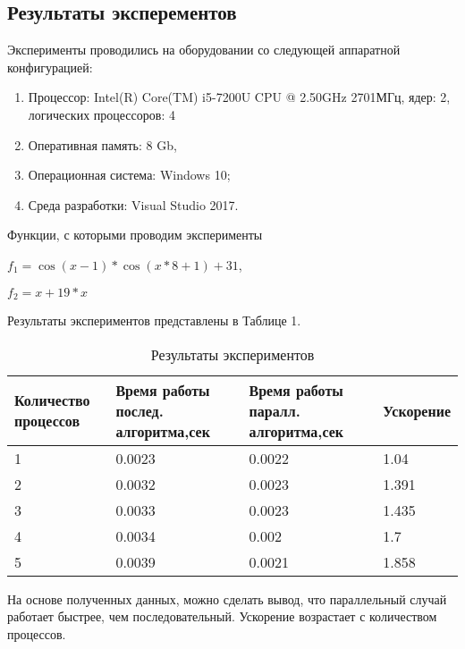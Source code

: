 \documentclass[a4paper]{report}
\begin{document}
\begin{center}
\section*{Результаты эксперементов}
\end{center}
\par Эксперименты проводились на оборудовании со следующей аппаратной конфигурацией:
\begin{enumerate}
\item Процессор: Intel(R) Core(TM) i5-7200U CPU @ 2.50GHz 2701МГц, ядер: 2, логических процессоров: 4
\item Оперативная память: 8 Gb,
\item Операционная система: Windows 10;
\item Среда разработки: Visual Studio 2017.
\end{enumerate}
\par Функции, с которыми проводим эксперименты 
\par $f_1 = \cos(x - 1) * \cos(x * 8 + 1) + 31$, 
\par $f_2 = x + 19 * x$
\par Результаты экспериментов представлены в Таблице 1.
\begin{table}[!h]
\caption{Результаты экспериментов}
\centering
\begin{tabular}{|p{3cm}|p{4cm}|p{4cm}|p{3cm}|}
\hline
Количество процессов & Время работы послед. алгоритма,сек & Время работы паралл. алгоритма,сек & Ускорение  \\\hline
1  & 0.0023 & 0.0022 & 1.04  \\\hline
2  & 0.0032 & 0.0023 & 1.391  \\\hline
3  & 0.0033 & 0.0023 & 1.435  \\\hline
4  & 0.0034 & 0.002 & 1.7  \\\hline
5  & 0.0039 & 0.0021 & 1.858  \\
\hline
\end{tabular}
\end{table}
\par На основе полученных данных, можно сделать вывод, что параллельный случай работает быстрее, чем последовательный. Ускорение возрастает с количеством процессов.
\newpage
\end{document}
